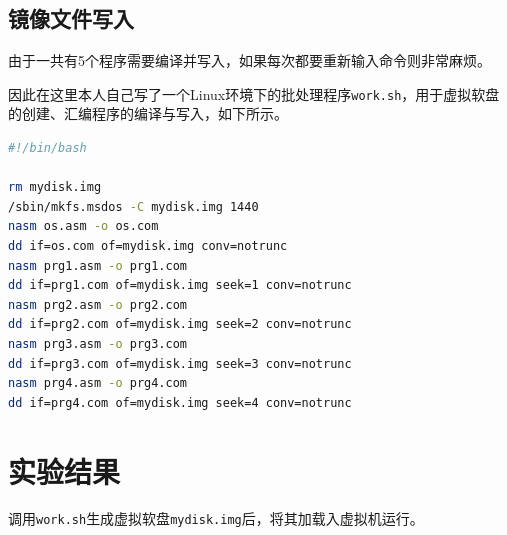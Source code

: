 \documentclass[logo,reportComp]{thesis}
\begin{document}
\subsection{镜像文件写入}
由于一共有5个程序需要编译并写入，如果每次都要重新输入命令则非常麻烦。

因此在这里本人自己写了一个Linux环境下的批处理程序\verb'work.sh'，用于虚拟软盘的创建、汇编程序的编译与写入，如下所示。
\begin{lstlisting}[language=bash]
#!/bin/bash

rm mydisk.img
/sbin/mkfs.msdos -C mydisk.img 1440
nasm os.asm -o os.com
dd if=os.com of=mydisk.img conv=notrunc
nasm prg1.asm -o prg1.com
dd if=prg1.com of=mydisk.img seek=1 conv=notrunc
nasm prg2.asm -o prg2.com
dd if=prg2.com of=mydisk.img seek=2 conv=notrunc
nasm prg3.asm -o prg3.com
dd if=prg3.com of=mydisk.img seek=3 conv=notrunc
nasm prg4.asm -o prg4.com
dd if=prg4.com of=mydisk.img seek=4 conv=notrunc
\end{lstlisting}

\section{实验结果}
调用\verb'work.sh'生成虚拟软盘\verb'mydisk.img'后，将其加载入虚拟机运行。
\end{document}
